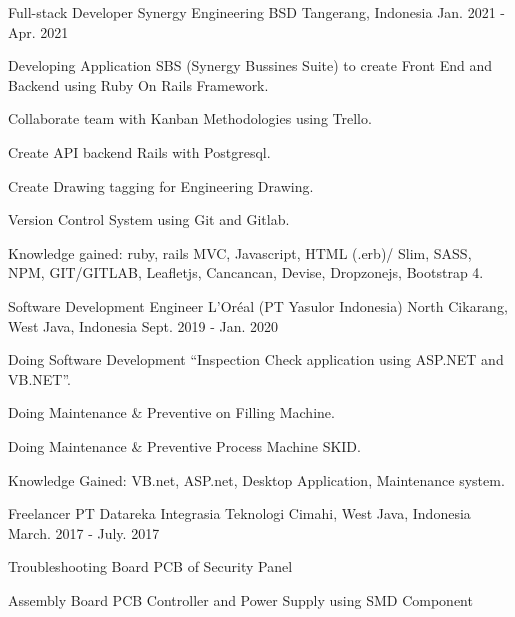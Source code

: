 \begin{cventries}
  \cventry
    {Full-stack Developer} %
    {Synergy Engineering} %
    {BSD Tangerang, Indonesia} %
    {Jan. 2021 - Apr. 2021} %
    {
      \begin{cvitems} %
        \item {Developing Application SBS (Synergy Bussines Suite) to create Front End and Backend using Ruby On Rails Framework.}
        \item {Collaborate team with Kanban Methodologies using Trello.}
        \item {Create API backend Rails with Postgresql.}
        \item {Create Drawing tagging for Engineering Drawing.}
        \item {Version Control System using Git and Gitlab.}
        \item {Knowledge gained: ruby, rails MVC, Javascript, HTML (.erb)/ Slim, SASS, NPM, GIT/GITLAB, Leafletjs, Cancancan, Devise, Dropzonejs, Bootstrap 4.}
      \end{cvitems}
    }

  \cventry
    {Software Development Engineer} %
    {L'Oréal (PT Yasulor Indonesia)} %
    {North Cikarang, West Java, Indonesia} %
    {Sept. 2019 - Jan. 2020} %
    {
      \begin{cvitems} %
        \item {Doing Software Development “Inspection Check application using ASP.NET and VB.NET”.}
        \item {Doing Maintenance \& Preventive on Filling Machine.}
        \item {Doing Maintenance \& Preventive Process Machine SKID.}
        \item {Knowledge Gained: VB.net, ASP.net, Desktop Application, Maintenance system.}
      \end{cvitems}
    }

  \cventry
    {Freelancer} %
    {PT Datareka Integrasia Teknologi}
    {Cimahi, West Java, Indonesia} %
    {March. 2017 - July. 2017} %
    {
      \begin{cvitems} %
        \item {Troubleshooting Board PCB of Security Panel}
        \item {Assembly Board PCB Controller and Power Supply using SMD Component}
      \end{cvitems}
    }


\end{cventries}
